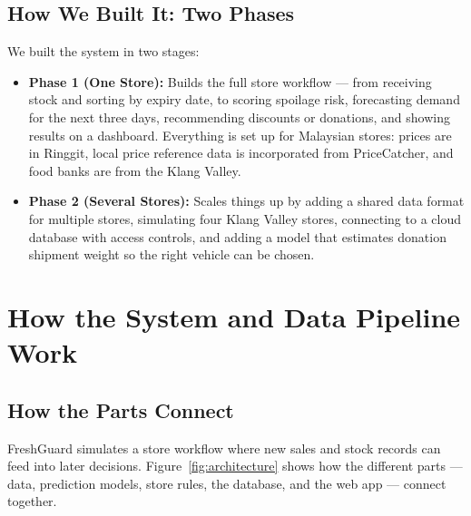 \documentclass[12pt,a4paper]{article}
\renewcommand{\_}{\oldunderscore\allowbreak}
\begin{document}
\subsection{How We Built It: Two Phases}
We built the system in two stages:
\begin{itemize}[leftmargin=18pt, itemsep=2pt]
    \item \textbf{Phase 1 (One Store):} Builds the full store workflow --- from receiving stock and sorting by expiry date, to scoring spoilage risk, forecasting demand for the next three days, recommending discounts or donations, and showing results on a dashboard. Everything is set up for Malaysian stores: prices are in Ringgit, local price reference data is incorporated from PriceCatcher, and food banks are from the Klang Valley.
    \item \textbf{Phase 2 (Several Stores):} Scales things up by adding a shared data format for multiple stores, simulating four Klang Valley stores, connecting to a cloud database with access controls, and adding a model that estimates donation shipment weight so the right vehicle can be chosen.
\end{itemize}

\section{How the System and Data Pipeline Work}

\subsection{How the Parts Connect}
FreshGuard simulates a store workflow where new sales and stock records can feed into later decisions. Figure~\ref{fig:architecture} shows how the different parts --- data, prediction models, store rules, the database, and the web app --- connect together.
\end{document}
